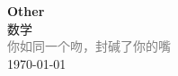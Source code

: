 \vspace*{\fill}
\begin{center}
    \textcolor{orange!50}{\Huge\textbf{Other}} \\[1em]
    \textcolor{orange!60!pink}{\Large 数学} \\[2em]
    \textcolor{gray}{\large 你如同一个吻，封碱了你的嘴} \\[1em]
    \today
\end{center}
\vspace*{\fill}
\clearpage


\clearpage

\clearpage
